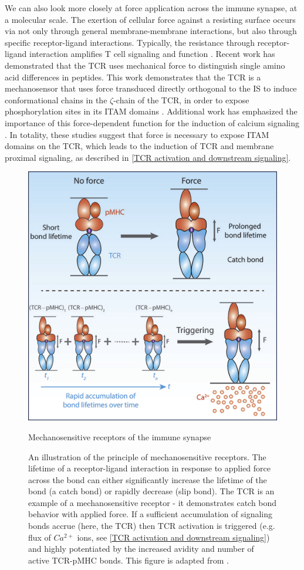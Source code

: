 We can also look more closely at force application across the immune synapse, at a molecular scale. The exertion of cellular force against a resisting surface occurs via not only through general membrane-membrane interactions, but also through specific receptor-ligand interactions.  Typically, the resistance through receptor-ligand interaction amplifies T cell signaling and function \cite{Huse}. Recent work has demonstrated that the TCR uses mechanical force to distinguish single amino acid differences in peptides. This work demonstrates that the TCR is a mechanosensor that uses force transduced directly orthogonal to the IS to induce conformational chains in the $\zeta$-chain of the TCR, in order to expose phosphorylation sites in its ITAM domains \cite{Aivazian2000}. Additional work has emphasized the importance of this force-dependent function for the induction of calcium signaling \cite{Liu2014}. In totality, these studies suggest that force is necessary to expose ITAM domains on the TCR, which leads to the induction of TCR and membrane proximal signaling, as described in \ref{TCR activation and downstream signaling}. 

\begin{figure}[htbp]
	\centering
	\includegraphics[width=0.8\columnwidth]{../figures/chapter1/tcrcatchbond.jpg}
	\caption{Mechanosensitive receptors of the immune synapse}
	\caption*{An illustration of the principle of mechanosensitive receptors. The lifetime of a receptor-ligand interaction in response to applied force across the bond can either significantly increase the lifetime of the bond (a catch bond) or rapidly decrease (slip bond). The TCR is an example of a mechanosensitive receptor -  it demonstrates catch bond behavior with applied force. If a sufficient accumulation of signaling bonds accrue (here, the TCR) then TCR activation is triggered (e.g. flux of $Ca^{2+}$ ions, see \ref{TCR activation and downstream signaling}) and highly potentiated by the increased avidity and number of active TCR-pMHC bonds. This figure is adapted from \cite{Liu2014}.}
	\label{fig:tcrcatchbond}
\end{figure}

